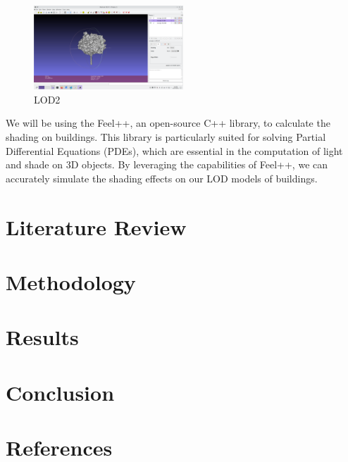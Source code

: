\documentclass[12pt]{article}
\begin{document}
\begin{figure}[H]
    \vspace{1.5cm}
    \centering
    \includegraphics[width=0.5\textwidth]{images/LOD2.png}
    \caption{LOD2}
\end{figure}

We will be using the Feel++, an open-source C++ library, to calculate the
shading on buildings. This library is particularly suited for solving
Partial Differential Equations (PDEs), which are essential in the computation
of light and shade on 3D objects\cite{feel++}. By leveraging the capabilities of Feel++,
we can accurately simulate the shading effects on our LOD models of buildings.

\newpage
\section{Literature Review}

\newpage

\section{Methodology}

\newpage

\section{Results}

\newpage

\section{Conclusion}

\newpage

\section{References}
\nocite{*}


\end{document}
